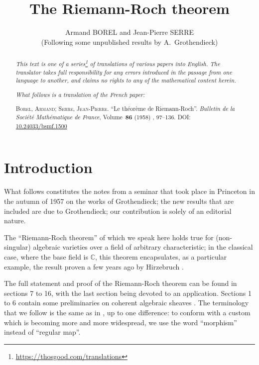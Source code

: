 \documentclass{article}
\title{The Riemann-Roch theorem}
\author{Armand BOREL and Jean-Pierre SERRE\\(Following some unpublished results by A.~Grothendieck)}
\date{}
\newcommand{\doctype}{French paper}
\newcommand{\origcit}{%
  \textsc{Borel, Armand}; \textsc{Serre, Jean-Pierre}.
  ``Le th\'{e}or\`{e}me de Riemann-Roch''.
  \emph{Bulletin de la Soci\'{e}t\'{e} Math\'{e}matique de France}, Volume~\textbf{86} (1958) , 97--136.
  \textsc{DOI}: \href{https://www.doi.org/10.24033/bsmf.1500}{10.24033/bsmf.1500}%
}
\theoremstyle{plain}
\theoremstyle{definition}
\newcommand{\oldpage}[1]{\marginpar{\footnotesize$\Big\vert$ \textit{p.~#1}}}
\begin{document}
\maketitle
\thispagestyle{fancy}

\renewcommand{\abstractname}{Translator's note.}

\begin{abstract}
  \renewcommand*{\thefootnote}{\fnsymbol{footnote}}
  \emph{This text is one of a series\footnote{\url{https://thosgood.com/translations}} of translations of various papers into English.}
  \emph{The translator takes full responsibility for any errors introduced in the passage from one language to another, and claims no rights to any of the mathematical content herein.}

  \medskip
  
  \emph{What follows is a translation of the \doctype:}

  \medskip\noindent
  \origcit
\end{abstract}

\setcounter{footnote}{0}

\tableofcontents



\section*{Introduction}

\oldpage{97}
What follows constitutes the notes from a seminar that took place in Princeton in the autumn of 1957 on the works of Grothendieck;
the new results that are included are due to Grothendieck;
our contribution is solely of an editorial nature.

The ``Riemann-Roch theorem'' of which we speak here holds true for (non-singular) algebraic varieties over a field of arbitrary characteristic;
in the classical case, where the base field is $\mathbb{C}$, this theorem encapsulates, as a particular example, the result proven a few years ago by Hirzebruch \cite{9}.

The full statement and proof of the Riemann-Roch theorem can be found in sections 7 to 16, with the last section being devoted to an application.
Sections 1 to 6 contain some preliminaries on coherent algebraic sheaves \cite{12}.
The terminology that we follow is the same as in \cite{12}, up to one difference: to conform with a custom which is becoming more and more widespread, we use the word ``morphism'' instead of ``regular map''.
\end{document}
